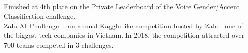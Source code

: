 

\\
Finished at 4th place on the Private Leaderboard of the Voice Gender/Accent Classification challenge.\\
\indent \href{https://challenge.zalo.ai}{Zalo AI Challenge} is an annual Kaggle-like competition hosted
by Zalo - one of the biggest tech companies in Vietnam. In 2018, the competition attracted
over 700 teams competed in 3 challenges.


